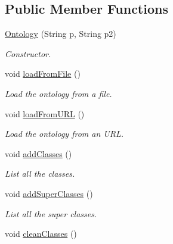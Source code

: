 \subsection*{Public Member Functions}
\begin{DoxyCompactItemize}
\item 
\hyperlink{class_ontology_1_1_ontology_a4b295f699ded2490f28a7ef27e7d10a8}{Ontology} (String p, String p2)
\begin{DoxyCompactList}\small\item\em Constructor. \end{DoxyCompactList}\item 
\hypertarget{class_ontology_1_1_ontology_acfa7d8a40bd1dc8e06abfa55b19ac993}{
void \hyperlink{class_ontology_1_1_ontology_acfa7d8a40bd1dc8e06abfa55b19ac993}{loadFromFile} ()}
\label{class_ontology_1_1_ontology_acfa7d8a40bd1dc8e06abfa55b19ac993}

\begin{DoxyCompactList}\small\item\em Load the ontology from a file. \end{DoxyCompactList}\item 
\hypertarget{class_ontology_1_1_ontology_a6f61430c49fe037a18b5267c02d1923a}{
void \hyperlink{class_ontology_1_1_ontology_a6f61430c49fe037a18b5267c02d1923a}{loadFromURL} ()}
\label{class_ontology_1_1_ontology_a6f61430c49fe037a18b5267c02d1923a}

\begin{DoxyCompactList}\small\item\em Load the ontology from an URL. \end{DoxyCompactList}\item 
void \hyperlink{class_ontology_1_1_ontology_a0b354cebd902e4cde66d5407e8e353ca}{addClasses} ()
\begin{DoxyCompactList}\small\item\em List all the classes. \end{DoxyCompactList}\item 
void \hyperlink{class_ontology_1_1_ontology_a7028d98e45511b5dbab527e311dd24a6}{addSuperClasses} ()
\begin{DoxyCompactList}\small\item\em List all the super classes. \end{DoxyCompactList}\item 
\hypertarget{class_ontology_1_1_ontology_a8290f5c9dd5e48694ab41c029edb8e47}{
void \hyperlink{class_ontology_1_1_ontology_a8290f5c9dd5e48694ab41c029edb8e47}{cleanClasses} ()}
\label{class_ontology_1_1_ontology_a8290f5c9dd5e48694ab41c029edb8e47}


\end{DoxyCompactItemize}
